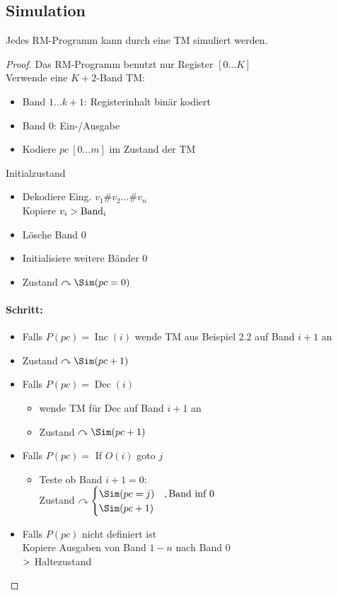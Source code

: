 \subsection{Simulation} %
\begin{Satz}[name={[Simulation von \acs*{RM} durch \acs*{TM}]}] %
	Jedes \ac{RM}-Programm kann durch eine \ac{TM} simuliert werden.
\end{Satz}
\begin{proof}
	Das \ac{RM}-Programm benutzt nur Register $[0\dots K]$\\
	Verwende eine $K+2$-Band \ac{TM}:
	\begin{itemize}
		\item Band $1\dots k+1$: Registerinhalt binär kodiert
		\item Band 0: Ein-/Ausgabe
		\item Kodiere $pc\ [0\dots m]$ im Zustand der \ac{TM}
	\end{itemize}
	Initialzustand
	\begin{itemize}
		\item Dekodiere Eing. $v_1\#v_2\dots \#{v_n}$\\
		Kopiere $v_i\->\operatorname{Band}_i$
		\item Lösche Band 0
		\item Initialisiere weitere Bänder 0
		\item Zustand $\curvearrowright\Sim(pc=0)$
	\end{itemize}
	\paragraph{Schritt:}
	\begin{itemize}
		\item Falls $P(pc)=\operatorname{Inc}(i)$ wende \ac{TM} aus Beispiel 2.2 %
		auf Band $i+1$ an
		\item Zustand $\curvearrowright \Sim(pc+1)$
		\item Falls $P(pc)=\operatorname{Dec}(i)$
		\begin{itemize}
			\item wende \ac{TM} für Dec auf Band $i+1$ an
			\item Zustand $\curvearrowright \Sim(pc+1)$
	\end{itemize}
	\item Falls $P(pc) =$ If $O(i)$ goto $j$
	\begin{itemize}
		\item Teste ob Band $i+1=0$:\\
		Zustand $\curvearrowright \begin{cases}
		\Sim(pc=j) & ,\text{Band inf 0}\\
		\Sim(pc+1)
		\end{cases}$
	\end{itemize}
	\item Falls $P(pc)$ nicht definiert ist\\
	Kopiere Ausgaben von Band $1-n$ nach Band 0\\
	$\->$ Haltezustand
	\end{itemize}
\end{proof}

